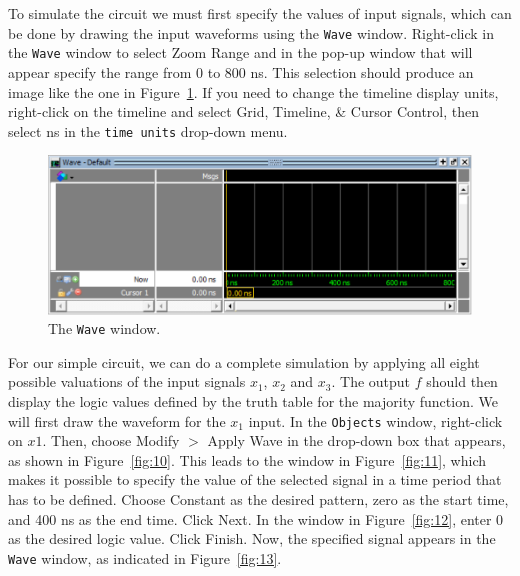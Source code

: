 \documentclass[11pt, twoside, pdftex]{article}
\begin{document}
To simulate the circuit we must first specify the values of input signals, which can be done 
by drawing the input waveforms using the \texttt{Wave} window. Right-click in the \texttt{Wave}
window to select {\sf Zoom Range} and in the pop-up window that will appear specify the range 
from 0 to 800 ns. This selection should produce an image like the one in Figure~\ref{fig:9}.
If you need to change the timeline display units, right-click on the timeline and select 
{\sf Grid, Timeline, \& Cursor Control}, then select 
{\sf ns} in the \texttt{time units} drop-down menu.

\begin{figure}[H]
   \begin{center}
      \includegraphics[scale=1.0]{figures/figure9.png}
       \caption{The \texttt{Wave} window.} 
	 \label{fig:9}
	 \end{center}
\end{figure}

For our simple circuit, we can do a complete simulation by applying all eight possible 
valuations of the input signals $x_1$, $x_2$ and $x_3$. The output $f$ should then display 
the logic values defined by the truth table for the majority function. We will first draw 
the waveform for the $x_1$ input.  In the \texttt{Objects} window, right-click on $x1$. Then, 
choose {\sf Modify $>$ Apply Wave} in the drop-down box that appears, as shown in 
Figure~\ref{fig:10}. This leads to the window in Figure~\ref{fig:11}, which makes it possible 
to specify the value of the selected signal in a time period that has to be defined. 
Choose {\sf Constant} as the desired pattern, zero as the start time, and 400 ns as 
the end time. Click {\sf Next}. In the window in Figure~\ref{fig:12}, enter 0 as the 
desired logic value. Click {\sf Finish}.  Now, the specified signal appears in the \texttt{Wave} 
window, as indicated in Figure~\ref{fig:13}.
\end{document}
